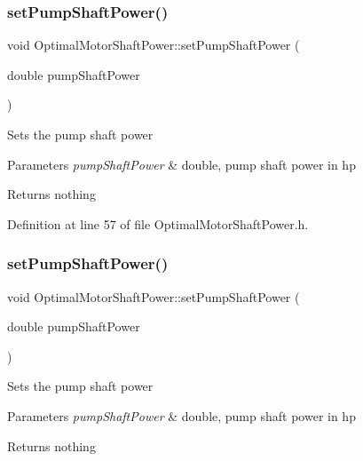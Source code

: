 \subsubsection{\texorpdfstring{set\+Pump\+Shaft\+Power()}{setPumpShaftPower()}\hspace{0.1cm}{\footnotesize\ttfamily [1/3]}}
{\footnotesize\ttfamily void Optimal\+Motor\+Shaft\+Power\+::set\+Pump\+Shaft\+Power (\begin{DoxyParamCaption}\item[{double}]{pump\+Shaft\+Power }\end{DoxyParamCaption})\hspace{0.3cm}{\ttfamily [inline]}}

Sets the pump shaft power


\begin{DoxyParams}{Parameters}
{\em pump\+Shaft\+Power} & double, pump shaft power in hp\\
\hline
\end{DoxyParams}
\begin{DoxyReturn}{Returns}
nothing 
\end{DoxyReturn}


Definition at line 57 of file Optimal\+Motor\+Shaft\+Power.\+h.

\mbox{\label{class_optimal_motor_shaft_power_ab2d80927fbaa62705359700b2a8f2f26}} 
\subsubsection{\texorpdfstring{set\+Pump\+Shaft\+Power()}{setPumpShaftPower()}\hspace{0.1cm}{\footnotesize\ttfamily [2/3]}}
{\footnotesize\ttfamily void Optimal\+Motor\+Shaft\+Power\+::set\+Pump\+Shaft\+Power (\begin{DoxyParamCaption}\item[{double}]{pump\+Shaft\+Power }\end{DoxyParamCaption})\hspace{0.3cm}{\ttfamily [inline]}}

Sets the pump shaft power


\begin{DoxyParams}{Parameters}
{\em pump\+Shaft\+Power} & double, pump shaft power in hp\\
\hline
\end{DoxyParams}
\begin{DoxyReturn}{Returns}
nothing 
\end{DoxyReturn}


